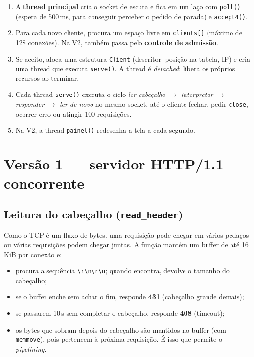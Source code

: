 \documentclass[11pt,a4paper]{article}
\begin{document}
\begin{enumerate}
  \item A \textbf{thread principal} cria o socket de escuta e fica em um laço com
  \texttt{poll()} (espera de 500\,ms, para conseguir perceber o pedido de parada) e
  \texttt{accept4()}.
  \item Para cada novo cliente, procura um espaço livre em \texttt{clients[]} (máximo de
  128 conexões). Na V2, também passa pelo \textbf{controle de admissão}.
  \item Se aceito, aloca uma estrutura \texttt{Client} (descritor, posição na tabela, IP)
  e cria uma thread que executa \texttt{serve()}. A thread é \emph{detached}: libera os
  próprios recursos ao terminar.
  \item Cada thread \texttt{serve()} executa o ciclo \emph{ler cabeçalho $\rightarrow$
  interpretar $\rightarrow$ responder $\rightarrow$ ler de novo} no mesmo socket, até o
  cliente fechar, pedir \texttt{close}, ocorrer erro ou atingir 100 requisições.
  \item Na V2, a thread \texttt{painel()} redesenha a tela a cada segundo.
\end{enumerate}

\section{Versão 1 --- servidor HTTP/1.1 concorrente}

\subsection{Leitura do cabeçalho (\texttt{read\_header})}
Como o TCP é um fluxo de bytes, uma requisição pode chegar em vários pedaços ou várias
requisições podem chegar juntas. A função mantém um buffer de até 16\,KiB por conexão e:
\begin{itemize}
  \item procura a sequência \texttt{\textbackslash r\textbackslash n\textbackslash r\textbackslash n};
  quando encontra, devolve o tamanho do cabeçalho;
  \item se o buffer enche sem achar o fim, responde \textbf{431} (cabeçalho grande demais);
  \item se passarem 10\,s sem completar o cabeçalho, responde \textbf{408} (timeout);
  \item os bytes que sobram depois do cabeçalho são mantidos no buffer (com \texttt{memmove}),
  pois pertencem à próxima requisição. É isso que permite o \emph{pipelining}.
\end{itemize}
\end{document}
